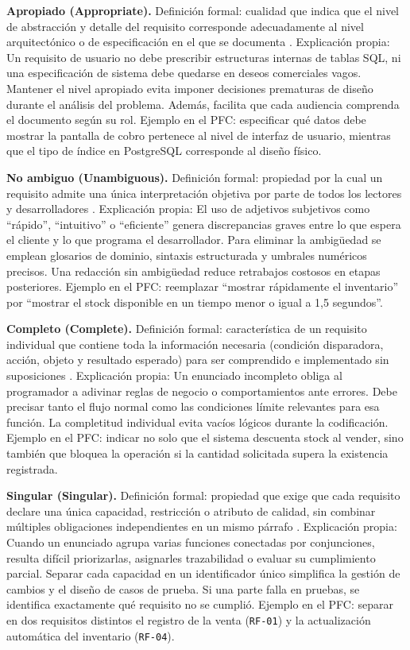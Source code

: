 \documentclass[onecolumn,12pt]{IEEEtran}
\begin{document}
	\textbf{Apropiado (Appropriate).} Definici\'on formal: cualidad que indica que el nivel de abstracci\'on y detalle del requisito corresponde adecuadamente al nivel arquitect\'onico o de especificaci\'on en el que se documenta \cite{iso29148}. Explicaci\'on propia: Un requisito de usuario no debe prescribir estructuras internas de tablas SQL, ni una especificaci\'on de sistema debe quedarse en deseos comerciales vagos. Mantener el nivel apropiado evita imponer decisiones prematuras de dise\~no durante el an\'alisis del problema. Adem\'as, facilita que cada audiencia comprenda el documento seg\'un su rol. Ejemplo en el PFC: especificar qu\'e datos debe mostrar la pantalla de cobro pertenece al nivel de interfaz de usuario, mientras que el tipo de \'indice en PostgreSQL corresponde al dise\~no f\'isico.
	
	\textbf{No ambiguo (Unambiguous).} Definici\'on formal: propiedad por la cual un requisito admite una \'unica interpretaci\'on objetiva por parte de todos los lectores y desarrolladores \cite{iso29148,pohl2025,ireb2023}. Explicaci\'on propia: El uso de adjetivos subjetivos como ``r\'apido'', ``intuitivo'' o ``eficiente'' genera discrepancias graves entre lo que espera el cliente y lo que programa el desarrollador. Para eliminar la ambig\"uedad se emplean glosarios de dominio, sintaxis estructurada y umbrales num\'ericos precisos. Una redacci\'on sin ambig\"uedad reduce retrabajos costosos en etapas posteriores. Ejemplo en el PFC: reemplazar ``mostrar r\'apidamente el inventario'' por ``mostrar el stock disponible en un tiempo menor o igual a 1,5 segundos''.
	
	\textbf{Completo (Complete).} Definici\'on formal: caracter\'istica de un requisito individual que contiene toda la informaci\'on necesaria (condici\'on disparadora, acci\'on, objeto y resultado esperado) para ser comprendido e implementado sin suposiciones \cite{iso29148,pohl2025}. Explicaci\'on propia: Un enunciado incompleto obliga al programador a adivinar reglas de negocio o comportamientos ante errores. Debe precisar tanto el flujo normal como las condiciones l\'imite relevantes para esa funci\'on. La completitud individual evita vac\'ios l\'ogicos durante la codificaci\'on. Ejemplo en el PFC: indicar no solo que el sistema descuenta stock al vender, sino tambi\'en que bloquea la operaci\'on si la cantidad solicitada supera la existencia registrada.
	
	\textbf{Singular (Singular).} Definici\'on formal: propiedad que exige que cada requisito declare una \'unica capacidad, restricci\'on o atributo de calidad, sin combinar m\'ultiples obligaciones independientes en un mismo p\'arrafo \cite{iso29148,mavin2009}. Explicaci\'on propia: Cuando un enunciado agrupa varias funciones conectadas por conjunciones, resulta dif\'icil priorizarlas, asignarles trazabilidad o evaluar su cumplimiento parcial. Separar cada capacidad en un identificador \'unico simplifica la gesti\'on de cambios y el dise\~no de casos de prueba. Si una parte falla en pruebas, se identifica exactamente qu\'e requisito no se cumpli\'o. Ejemplo en el PFC: separar en dos requisitos distintos el registro de la venta (\texttt{RF-01}) y la actualizaci\'on autom\'atica del inventario (\texttt{RF-04}).
	
\end{document}
